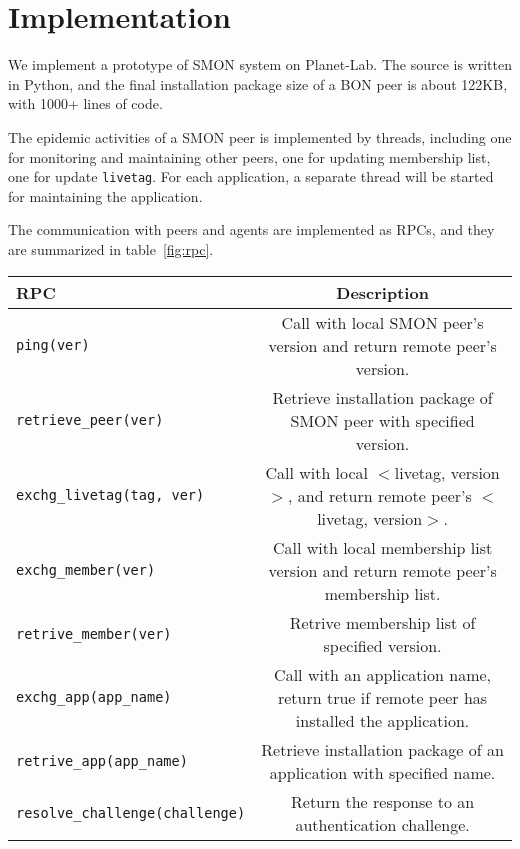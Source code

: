 \section{Implementation}
\label{sec:impl}

We implement a prototype of SMON system on Planet-Lab.  The
source is written in Python, and the final installation
package size of a BON peer is about 122KB, with 1000+ lines
of code.

The epidemic activities of a SMON peer is implemented by
threads, including one for monitoring and maintaining other
peers, one for updating membership list, one for update
\texttt{livetag}. For each application, a separate thread
will be started for maintaining the application.

The communication with peers and agents are implemented as
RPCs, and they are summarized in table~\ref{fig:rpc}.

\begin{table*}
\small
\centering
\begin{tabular}{|l|c|}

\hline
RPC & Description \\

\hline
\texttt{ping(ver)} & Call with local SMON peer's version and
return remote peer's version.\\

\hline
\texttt{retrieve\_peer(ver)} & Retrieve installation package
of SMON peer with specified version.\\

\hline
\texttt{exchg\_livetag(tag, ver)} & Call with local
$<$livetag, version$>$, and return remote peer's $<$livetag,
version$>$.\\

\hline
\texttt{exchg\_member(ver)} & Call with local membership
list version and return remote peer's membership list.\\

\hline
\texttt{retrive\_member(ver)} & Retrive membership list of
specified version.\\

\hline
\texttt{exchg\_app(app\_name)} & Call with an application
name, return true if remote peer has installed the
application.\\

\hline
\texttt{retrive\_app(app\_name)} & Retrieve installation package
of an application with specified name.\\

\hline
\texttt{resolve\_challenge(challenge)} & Return the response
to an authentication challenge.\\

\hline

\end{tabular}
\caption{RPC interfaces of SMON peer and authentication
agent}
\label{fig:rpc}
\end{table*}


